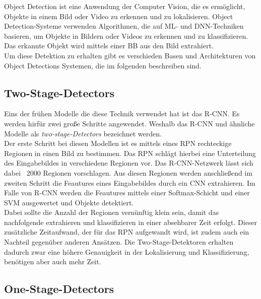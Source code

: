 Object Detection ist eine Anwendung der Computer Vision, die es ermöglicht, Objekte in einem Bild oder Video zu erkennen und zu lokalisieren. Object Detection-Systeme verwenden Algorithmen, die auf \ac{ML}- und \ac{DNN}-Techniken basieren, um Objekte in Bildern oder Videos zu erkennen und zu klassifizieren. Das erkannte Objekt wird mittels einer \ac{BB} aus den Bild extrahiert.\\
Um diese Detektion zu erhalten gibt es verschieden Basen und Architekturen von Object Detections Systemen, die im folgenden beschreiben sind. \cite{cv_Szeliski}

\subsection{Two-Stage-Detectors}

Eins der frühen Modelle die diese Technik verwendet hat ist das \ac{R-CNN}. Es werden hirfür zwei große Schritte angewendet. Weshalb das \ac{R-CNN} und ähnliche Modelle als \textit{two-stage-Detectors} bezeichnet werden.\\
Der erste Schritt bei diesen Modellen ist es mittels eines \ac{RPN} rechteckige Regionen in einen Bild zu bestimmen.
Das \ac{RPN} schlägt hierbei eine Unterteilung des Eingabebildes in verschiedene Regionen vor. Das \ac{R-CNN}-Netzwerk lässt sich dabei ~2000 Regionen vorschlagen.
Aus diesen Regionen werden anschließend im zweiten Schritt die Feautures eines Eingabebildes durch ein \ac{CNN} extrahieren. Im Falle von \ac{R-CNN} werden die Feautures mittels einer Softmax-Schicht und einer \ac{SVM} ausgewertet und Objekte detektiert.\\
Dabei sollte die Anzahl der Regionen vernünftig klein sein, damit das nachfolgende extrahieren und klassifizieren in einer absehbarer Zeit erfolgt. Dieser zusätzliche Zeitaufwand, der für das \ac{RPN} aufgewandt wird, ist zudem auch ein Nachteil gegenüber anderen Ansätzen. Die Two-Stage-Detektoren erhalten dadurch zwar eine höhere Genauigkeit in der Lokalisierung und Klassifizierung, benötigen aber auch mehr Zeit.\cite{R_CNN}

\subsection{One-Stage-Detectors}

